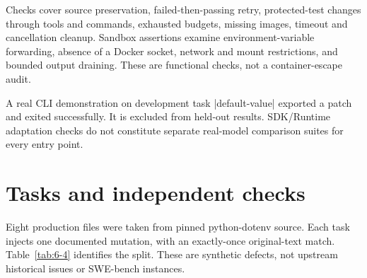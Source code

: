 Checks cover source preservation, failed-then-passing retry, protected-test changes through tools and commands, exhausted budgets, missing images, timeout and cancellation cleanup. Sandbox assertions examine environment-variable forwarding, absence of a Docker socket, network and mount restrictions, and bounded output draining. These are functional checks, not a container-escape audit.

A real CLI demonstration on development task \code|default-value| exported a patch and exited successfully. It is excluded from held-out results. SDK/Runtime adaptation checks do not constitute separate real-model comparison suites for every entry point.

\section{Tasks and independent checks}\label{sec:6.3}

Eight production files were taken from pinned python-dotenv source. Each task injects one documented mutation, with an exactly-once original-text match. Table~\ref{tab:6-4} identifies the split. These are synthetic defects, not upstream historical issues or SWE-bench instances.

